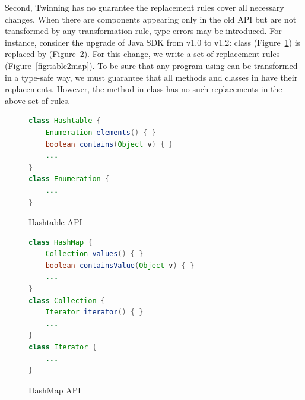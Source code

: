Second, Twinning has no guarantee
the replacement rules cover all necessary changes.
When there are components appearing only in the old API but are not
transformed by any transformation rule, type errors may be introduced.
For instance, consider the upgrade of Java SDK from v1.0
to v1.2: class  (Figure~\ref{fig:hashtable}) is replaced by
 (Figure~\ref{fig:hashmap}). For this change, we write a set of 
replacement rules (Figure~\ref{fig:table2map}).
%
To be sure that any program using  can be transformed 
in a type-safe way, we must guarantee that all methods and classes in
 have their replacements. However, the method 
in class  has no such replacements in the 
above set of rules. %

\begin{figure}
\begin{lstlisting}[language=java]
class Hashtable {
    Enumeration elements() { }
    boolean contains(Object v) { }
    ...
}
class Enumeration {
    ...
}
\end{lstlisting}
\caption{Hashtable API}
\label{fig:hashtable}
\end{figure}

\begin{figure}
\begin{lstlisting}[language=java]
class HashMap {
    Collection values() { }            
    boolean containsValue(Object v) { }
    ...
}
class Collection {
    Iterator iterator() { }
    ...
}
class Iterator {
    ...
}
\end{lstlisting}
\caption{HashMap API}
\label{fig:hashmap}
\end{figure}


